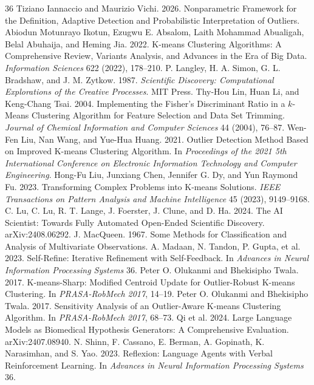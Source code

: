 \documentclass[sigconf,review,anonymous=false]{acmart}
\begin{document}
\begin{thebibliography}{36}
 Tiziano Iannaccio and Maurizio Vichi. 2026. Nonparametric Framework for the Definition, Adaptive Detection and Probabilistic Interpretation of Outliers.
 Abiodun Motunrayo Ikotun, Ezugwu E. Absalom, Laith Mohammad Abualigah, Belal Abuhaija, and Heming Jia. 2022. K-means Clustering Algorithms: A Comprehensive Review, Variants Analysis, and Advances in the Era of Big Data. \emph{Information Sciences} 622 (2022), 178--210.
 P. Langley, H. A. Simon, G. L. Bradshaw, and J. M. Zytkow. 1987. \emph{Scientific Discovery: Computational Explorations of the Creative Processes}. MIT Press.
 Thy-Hou Lin, Huan Li, and Keng-Chang Tsai. 2004. Implementing the Fisher's Discriminant Ratio in a $k$-Means Clustering Algorithm for Feature Selection and Data Set Trimming. \emph{Journal of Chemical Information and Computer Sciences} 44 (2004), 76--87.
 Wen-Fen Liu, Nan Wang, and Yue-Hua Huang. 2021. Outlier Detection Method Based on Improved K-means Clustering Algorithm. In \emph{Proceedings of the 2021 5th International Conference on Electronic Information Technology and Computer Engineering}.
 Hong-Fu Liu, Junxiang Chen, Jennifer G. Dy, and Yun Raymond Fu. 2023. Transforming Complex Problems into K-means Solutions. \emph{IEEE Transactions on Pattern Analysis and Machine Intelligence} 45 (2023), 9149--9168.
 C. Lu, C. Lu, R. T. Lange, J. Foerster, J. Clune, and D. Ha. 2024. The AI Scientist: Towards Fully Automated Open-Ended Scientific Discovery. arXiv:2408.06292.
 J. MacQueen. 1967. Some Methods for Classification and Analysis of Multivariate Observations.
 A. Madaan, N. Tandon, P. Gupta, et al. 2023. Self-Refine: Iterative Refinement with Self-Feedback. In \emph{Advances in Neural Information Processing Systems} 36.
 Peter O. Olukanmi and Bhekisipho Twala. 2017. K-means-Sharp: Modified Centroid Update for Outlier-Robust K-means Clustering. In \emph{PRASA-RobMech 2017}, 14--19.
 Peter O. Olukanmi and Bhekisipho Twala. 2017. Sensitivity Analysis of an Outlier-Aware K-means Clustering Algorithm. In \emph{PRASA-RobMech 2017}, 68--73.
 Qi et al. 2024. Large Language Models as Biomedical Hypothesis Generators: A Comprehensive Evaluation. arXiv:2407.08940.
 N. Shinn, F. Cassano, E. Berman, A. Gopinath, K. Narasimhan, and S. Yao. 2023. Reflexion: Language Agents with Verbal Reinforcement Learning. In \emph{Advances in Neural Information Processing Systems} 36.

\end{thebibliography}
\end{document}
